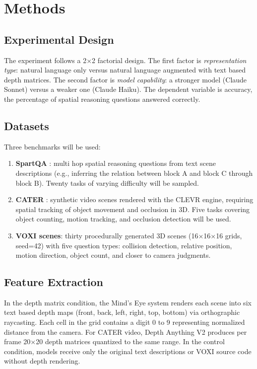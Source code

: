 \documentclass[stu,12pt,a4paper,floatsintext]{apa7}
\begin{document}
\section*{Methods}

\subsection*{Experimental Design}

The experiment follows a 2$\times$2 factorial design. The first factor is \emph{representation type}: natural language only versus natural language augmented with text based depth matrices. The second factor is \emph{model capability}: a stronger model (Claude Sonnet) versus a weaker one (Claude Haiku). The dependent variable is accuracy, the percentage of spatial reasoning questions answered correctly.

\subsection*{Datasets}

Three benchmarks will be used:

\begin{enumerate}
\item \textbf{SpartQA} \cite{mirzaee2021}: multi hop spatial reasoning questions from text scene descriptions (e.g., inferring the relation between block A and block C through block B). Twenty tasks of varying difficulty will be sampled.

\item \textbf{CATER} \cite{girdhar2020}: synthetic video scenes rendered with the CLEVR engine, requiring spatial tracking of object movement and occlusion in 3D. Five tasks covering object counting, motion tracking, and occlusion detection will be used.

\item \textbf{VOXI scenes}: thirty procedurally generated 3D scenes (16$\times$16$\times$16 grids, seed=42) with five question types: collision detection, relative position, motion direction, object count, and closer to camera judgments.
\end{enumerate}

\subsection*{Feature Extraction}

In the depth matrix condition, the Mind's Eye system renders each scene into six text based depth maps (front, back, left, right, top, bottom) via orthographic raycasting. Each cell in the grid contains a digit 0 to 9 representing normalized distance from the camera. For CATER video, Depth Anything V2 produces per frame 20$\times$20 depth matrices quantized to the same range. In the control condition, models receive only the original text descriptions or VOXI source code without depth rendering.
\end{document}
